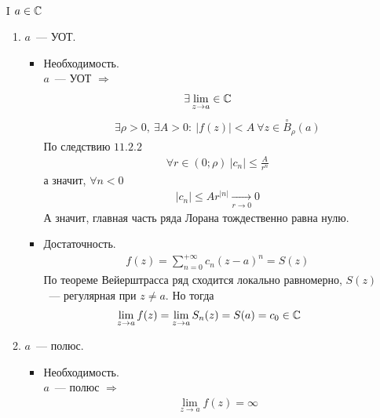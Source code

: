 \pr
~
\begin{itemize}
    \item[I] $a \in \mathbb{C}$
    \begin{enumerate}
        \item $a$~--- УОТ.
        \begin{itemize}
            \item Необходимость.
            \\
            $a$~--- УОТ $\Rightarrow$
            \begin{align*}
              & \exists \lim_{z \to a} \in \mathbb{C}
            \end{align*}
            \begin{align*}
              & \exists \rho > 0, \ \exists A > 0: \ \left| f(z) \right| < A \ \forall z \in \overset{\circ}{B}_{\rho}(a)
            \end{align*}
            По следствию $11.2.2$
            \begin{align*}
              & \forall r \in (0;\rho) \ \left| c_n \right| \leq \frac{A}{r^n}
            \end{align*}
            а значит, $\forall n < 0$
            \begin{align*}
              & \left| c_n \right| \leq Ar^{\left| n \right|} \underset{r\to 0}{\longrightarrow} 0
            \end{align*}
            А значит, главная часть ряда Лорана тождественно равна нулю.
            \item Достаточность.
            \begin{align*}
              & f(z) = \sum_{n=0}^{+\infty}c_n(z-a)^n = S(z)
            \end{align*}
            По теореме Вейерштрасса ряд сходится локально равномерно, $S(z)$~---
            регулярная при $z \neq a$. Но тогда
            \begin{align*}
              & \lim_{z \to a}f(z) = \lim_{z \to a}S_n(z) = S(a) = c_0 \in \mathbb{C}
            \end{align*}
        \end{itemize}
        \item $a$~--- полюс.
        \begin{itemize}
            \item Необходимость.
            \\
            $a$~--- полюс $\Rightarrow$
            \begin{align*}
              & \lim_{z \to a}f(z) = \infty
            \end{align*}

\end{itemize}
\end{enumerate}
\end{itemize}
